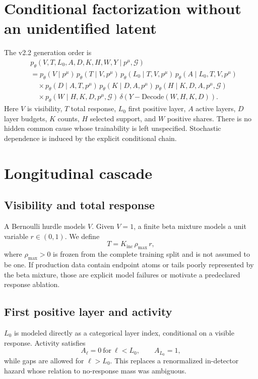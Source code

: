 \documentclass[10pt,a4paper]{article}
\newcommand{\pFour}{p^{\mu}}
\newcommand{\Kinc}{K_{\mathrm{inc}}}
\begin{document}
\section{Conditional factorization without an unidentified latent}
\label{sec:factorization}

The v2.2 generation order is
\begin{align}
&p_\theta(V,T,L_0,A,D,K,H,W,Y\mid \pFour,\mathcal G)\\
&=p_\theta(V\mid \pFour)\,
  p_\theta(T\mid V,\pFour)\,
  p_\theta(L_0\mid T,V,\pFour)\,
  p_\theta(A\mid L_0,T,V,\pFour)\nonumber\\
&\quad\times p_\theta(D\mid A,T,\pFour)\,
  p_\theta(K\mid D,A,\pFour)\,
  p_\theta(H\mid K,D,A,\pFour,\mathcal G)\nonumber\\
&\quad\times p_\theta(W\mid H,K,D,\pFour,\mathcal G)\,
  \delta\!\left(Y-\mathrm{Decode}(W,H,K,D)\right).
\label{eq:factorization}
\end{align}
Here $V$ is visibility, $T$ total response, $L_0$ first positive layer, $A$ active layers, $D$ layer budgets, $K$ counts, $H$ selected support, and $W$ positive shares. There is no hidden common cause whose trainability is left unspecified. Stochastic dependence is induced by the explicit conditional chain.

\section{Longitudinal cascade}
\label{sec:cascade}

\subsection{Visibility and total response}
A Bernoulli hurdle models $V$. Given $V=1$, a finite beta mixture models a unit variable $r\in(0,1)$. We define
\begin{equation}
 T=\Kinc\,\rho_{\max}\,r,
 \label{eq:response}
\end{equation}
where $\rho_{\max}>0$ is frozen from the complete training split and is not assumed to be one. If production data contain endpoint atoms or tails poorly represented by the beta mixture, those are explicit model failures or motivate a predeclared response ablation.

\subsection{First positive layer and activity}
\label{sec:l0activity}
$L_0$ is modeled directly as a categorical layer index, conditional on a visible response. Activity satisfies
\begin{equation}
 A_\ell=0\ \text{for}\ \ell<L_0,\qquad A_{L_0}=1,
 \label{eq:l0activity}
\end{equation}
while gaps are allowed for $\ell>L_0$. This replaces a renormalized in-detector hazard whose relation to no-response mass was ambiguous.
\end{document}
